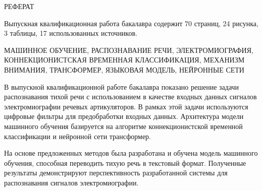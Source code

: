 \setcounter{page}{2}
{\centerline{\uppercase{Реферат}}}

Выпускная квалификационная работа бакалавра содержит 70 страниц, 24 рисунка, 3 таблицы, 17 использованных источников.

\uppercase{
    машинное обучение, распознавание речи, электромиография, коннекционистская временная классификация, механизм внимания, трансформер, языковая модель, нейронные сети
}

В выпускной квалификационной работе бакалавра показано решение задачи распознавания тихой речи с использованием в качестве 
входных данных сигналов электромиографии речевых артикуляторов. В рамках этой задачи используются цифровые фильтры для предобработки входных данных.
Архитектура модели машинного обучения базируется на алгоритме коннекционистской временной классификации
и нейронной сети трансформер.

На основе предложенных методов была разработана и обучена модель машинного обучения, способная переводить тихую речь в текстовый формат.
Полученные результаты демонстрируют перспективность разработанной системы для распознавания сигналов электромиографии.

